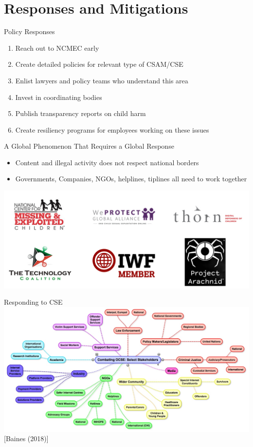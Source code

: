 \documentclass[nobackground,dvipsnames,table,aspectratio=169]{beamer}
\begin{document}
\section{Responses and Mitigations}

\begin{frame}{Policy Responses}
    \large
    \begin{enumerate}
        \item Reach out to NCMEC early
        \item Create detailed policies for relevant type of CSAM/CSE
        \item Enlist lawyers and policy teams who understand this area
        \item Invest in coordinating bodies
        \item Publish transparency reports on child harm
        \item Create resiliency programs for employees working on these issues
    \end{enumerate}
\end{frame}

\begin{frame}{A Global Phenomenon That Requires a Global Response}
    \begin{itemize}
        \item Content and illegal activity does not respect national borders
        \item Governments, Companies, NGOs, helplines, tiplines all need to work together
    \end{itemize}
    \includegraphics[width=\textwidth]{organizations}
\end{frame}

\begin{frame}{Responding to CSE}
    \centering
    \includegraphics[width=\textwidth]{responding-to-ocse}
    [Baines (2018)]
\end{frame}
\end{document}

